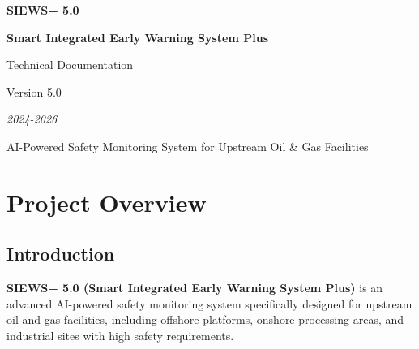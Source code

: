 \documentclass[12pt,a4paper,oneside]{book}
\begin{document}
\begin{titlepage}
    \centering
    \vspace*{3cm}

    {\Huge\bfseries SIEWS+ 5.0\par}
    \vspace{0.5cm}
    {\LARGE\bfseries Smart Integrated Early Warning System Plus\par}
    \vspace{1.5cm}

    {\LARGE Technical Documentation\par}
    \vspace{2cm}

    {\large Version 5.0\par}
    \vspace{1cm}

    {\large\textit{\textcopyright{} 2024-2026}\par}
    \vspace{2cm}

    \begin{minipage}{\linewidth}
        \centering
        AI-Powered Safety Monitoring System for Upstream Oil \& Gas Facilities
    \end{minipage}

    \vfill

\end{titlepage}

\tableofcontents
\newpage

\onehalfspacing

\chapter{Project Overview}

\section{Introduction}

\textbf{SIEWS+ 5.0 (Smart Integrated Early Warning System Plus)} is an advanced AI-powered safety monitoring system specifically designed for upstream oil and gas facilities, including offshore platforms, onshore processing areas, and industrial sites with high safety requirements.
\end{document}

